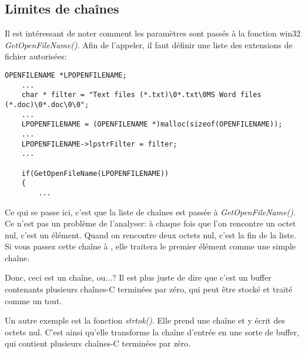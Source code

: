 \subsection{Limites de chaînes}

Il est intéressant de noter comment les paramètres sont passés à la fonction win32
\emph{GetOpenFileName()}. Afin de l'appeler, il faut définir une liste des extensions
de fichier autorisées:

\begin{lstlisting}[style=customc]
	OPENFILENAME *LPOPENFILENAME;
	...
	char * filter = "Text files (*.txt)\0*.txt\0MS Word files (*.doc)\0*.doc\0\0";
	...
	LPOPENFILENAME = (OPENFILENAME *)malloc(sizeof(OPENFILENAME));
	...
	LPOPENFILENAME->lpstrFilter = filter;
	...

	if(GetOpenFileName(LPOPENFILENAME))
	{
		...
\end{lstlisting}

Ce qui se passe ici, c'est que la liste de chaînes est passée à \emph{GetOpenFileName()}.
Ce n'est pas un problème de l'analyser: à chaque fois que l'on rencontre un octet
nul, c'est un élément.
Quand on rencontre deux octets nul, c'est la fin de la liste.
Si vous passez cette chaîne à \printf, elle traitera le premier élément comme une
simple chaîne.

Donc, ceci est un chaîne, ou...?
Il est plus juste de dire que c'est un buffer contenants plusieurs chaînes-C terminées
par zéro, qui peut être stocké et traité comme un tout.

Un autre exemple est la fonction \emph{strtok()}. Elle prend une chaîne et y écrit
des octets nul.
C'est ainsi qu'elle transforme la chaîne d'entrée en une sorte de buffer, qui contient
plusieurs chaînes-C terminées par zéro.

